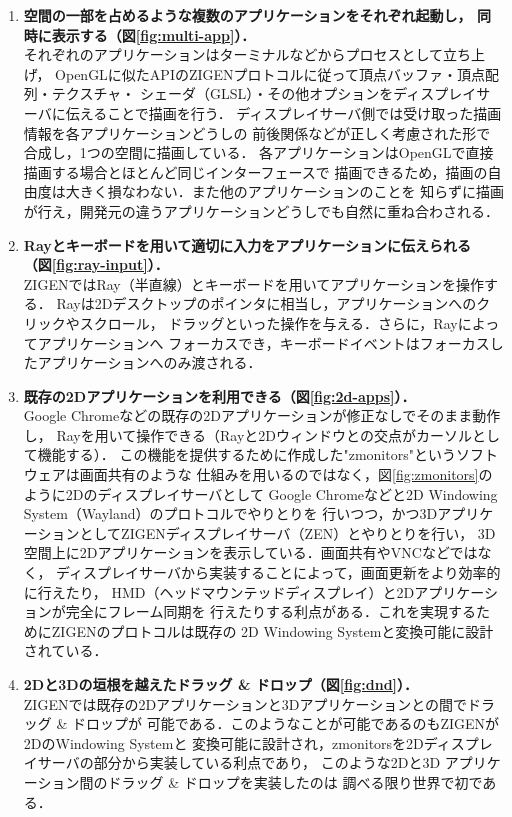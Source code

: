 \begin{enumerate}
  \item \textbf{空間の一部を占めるような複数のアプリケーションをそれぞれ起動し，
        同時に表示する（図\ref{fig:multi-app}）．}\\
        それぞれのアプリケーションはターミナルなどからプロセスとして立ち上げ，
        OpenGLに似たAPIのZIGENプロトコルに従って頂点バッファ・頂点配列・テクスチャ・
        シェーダ（GLSL）・その他オプションをディスプレイサーバに伝えることで描画を行う．
        ディスプレイサーバ側では受け取った描画情報を各アプリケーションどうしの
        前後関係などが正しく考慮された形で合成し，1つの空間に描画している．
        各アプリケーションはOpenGLで直接描画する場合とほとんど同じインターフェースで
        描画できるため，描画の自由度は大きく損なわない．また他のアプリケーションのことを
        知らずに描画が行え，開発元の違うアプリケーションどうしでも自然に重ね合わされる．
  \item \textbf{Rayとキーボードを用いて適切に入力をアプリケーションに伝えられる
        （図\ref{fig:ray-input}）．}\\
        ZIGENではRay（半直線）とキーボードを用いてアプリケーションを操作する．
        Rayは2Dデスクトップのポインタに相当し，アプリケーションへのクリックやスクロール，
        ドラッグといった操作を与える．さらに，Rayによってアプリケーションへ
        フォーカスでき，キーボードイベントはフォーカスしたアプリケーションへのみ渡される．
  \item \textbf{既存の2Dアプリケーションを利用できる（図\ref{fig:2d-apps}）．}\\
        Google Chromeなどの既存の2Dアプリケーションが修正なしでそのまま動作し，
        Rayを用いて操作できる（Rayと2Dウィンドウとの交点がカーソルとして機能する）．
        この機能を提供するために作成した"zmonitors"というソフトウェアは画面共有のような
        仕組みを用いるのではなく，図\ref{fig:zmonitors}のように2Dのディスプレイサーバとして
        Google Chromeなどと2D Windowing System（Wayland）のプロトコルでやりとりを
        行いつつ，かつ3DアプリケーションとしてZIGENディスプレイサーバ（ZEN）とやりとりを行い，
        3D空間上に2Dアプリケーションを表示している．画面共有やVNCなどではなく，
        ディスプレイサーバから実装することによって，画面更新をより効率的に行えたり，
        HMD（ヘッドマウンテッドディスプレイ）と2Dアプリケーションが完全にフレーム同期を
        行えたりする利点がある．これを実現するためにZIGENのプロトコルは既存の
        2D Windowing Systemと変換可能に設計されている．
  \item \textbf{2Dと3Dの垣根を越えたドラッグ \& ドロップ（図\ref{fig:dnd}）．}\\
        ZIGENでは既存の2Dアプリケーションと3Dアプリケーションとの間でドラッグ \& ドロップが
        可能である．このようなことが可能であるのもZIGENが2DのWindowing Systemと
        変換可能に設計され，zmonitorsを2Dディスプレイサーバの部分から実装している利点であり，
        このような2Dと3D アプリケーション間のドラッグ \& ドロップを実装したのは
        調べる限り世界で初である．
\end{enumerate}

